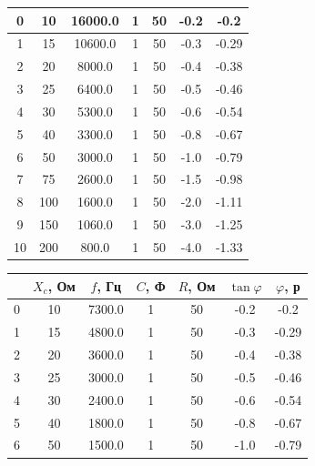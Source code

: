 \documentclass[a4paper,12pt]{article}
\begin{document}
\begin{justify}
\begin{table}[htp]
\begin{tabular}{|c|c|c|c|c|c|c|}
0  & 10        & 16000.0 & 1      & 50      & -0.2          & -0.2         \\ \hline
1  & 15        & 10600.0 & 1      & 50      & -0.3          & -0.29        \\ \hline
2  & 20        & 8000.0  & 1      & 50      & -0.4          & -0.38        \\ \hline
3  & 25        & 6400.0  & 1      & 50      & -0.5          & -0.46        \\ \hline
4  & 30        & 5300.0  & 1      & 50      & -0.6          & -0.54        \\ \hline
5  & 40        & 3300.0  & 1      & 50      & -0.8          & -0.67        \\ \hline
6  & 50        & 3000.0  & 1      & 50      & -1.0          & -0.79        \\ \hline
7  & 75        & 2600.0  & 1      & 50      & -1.5          & -0.98        \\ \hline
8  & 100       & 1600.0  & 1      & 50      & -2.0          & -1.11        \\ \hline
9  & 150       & 1060.0  & 1      & 50      & -3.0          & -1.25        \\ \hline
10 & 200       & 800.0   & 1      & 50      & -4.0          & -1.33        \\ \hline
\end{tabular}
\end{table}
   \begin{table}[htp]
   \centering
\begin{tabular}{|c|c|c|c|c|c|c|}
\hline
   & $X_c$, Ом & $f$, Гц & $C$, Ф & $R$, Ом & $\tan\varphi$ & $\varphi$, р \\ \hline
0  & 10        & 7300.0  & 1      & 50      & -0.2          & -0.2         \\ \hline
1  & 15        & 4800.0  & 1      & 50      & -0.3          & -0.29        \\ \hline
2  & 20        & 3600.0  & 1      & 50      & -0.4          & -0.38        \\ \hline
3  & 25        & 3000.0  & 1      & 50      & -0.5          & -0.46        \\ \hline
4  & 30        & 2400.0  & 1      & 50      & -0.6          & -0.54        \\ \hline
5  & 40        & 1800.0  & 1      & 50      & -0.8          & -0.67        \\ \hline
6  & 50        & 1500.0  & 1      & 50      & -1.0          & -0.79        \\ \hline

\end{tabular}
\end{table}
\end{justify}
\end{document}
